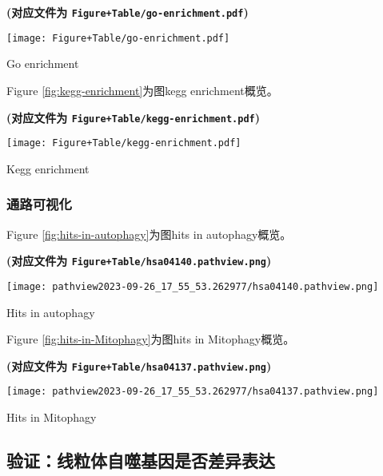 \documentclass[
]{article}
\begin{document}
\textbf{(对应文件为 \texttt{Figure+Table/go-enrichment.pdf})}

\def\@captype{figure}
\begin{center}
\texttt{[image: Figure+Table/go-enrichment.pdf]}
\caption{Go enrichment}\label{fig:go-enrichment}
\end{center}

Figure \ref{fig:kegg-enrichment}为图kegg enrichment概览。

\textbf{(对应文件为 \texttt{Figure+Table/kegg-enrichment.pdf})}

\def\@captype{figure}
\begin{center}
\texttt{[image: Figure+Table/kegg-enrichment.pdf]}
\caption{Kegg enrichment}\label{fig:kegg-enrichment}
\end{center}

\hypertarget{ux901aux8defux53efux89c6ux5316}{%
\subsubsection{通路可视化}\label{ux901aux8defux53efux89c6ux5316}}

Figure \ref{fig:hits-in-autophagy}为图hits in autophagy概览。

\textbf{(对应文件为 \texttt{Figure+Table/hsa04140.pathview.png})}

\def\@captype{figure}
\begin{center}
\texttt{[image: pathview2023-09-26\_17\_55\_53.262977/hsa04140.pathview.png]}
\caption{Hits in autophagy}\label{fig:hits-in-autophagy}
\end{center}

Figure \ref{fig:hits-in-Mitophagy}为图hits in Mitophagy概览。

\textbf{(对应文件为 \texttt{Figure+Table/hsa04137.pathview.png})}

\def\@captype{figure}
\begin{center}
\texttt{[image: pathview2023-09-26\_17\_55\_53.262977/hsa04137.pathview.png]}
\caption{Hits in Mitophagy}\label{fig:hits-in-Mitophagy}
\end{center}

\hypertarget{ux9a8cux8bc1ux7ebfux7c92ux4f53ux81eaux566cux57faux56e0ux662fux5426ux5deeux5f02ux8868ux8fbe}{%
\subsection{验证：线粒体自噬基因是否差异表达}\label{ux9a8cux8bc1ux7ebfux7c92ux4f53ux81eaux566cux57faux56e0ux662fux5426ux5deeux5f02ux8868ux8fbe}}
\end{document}
